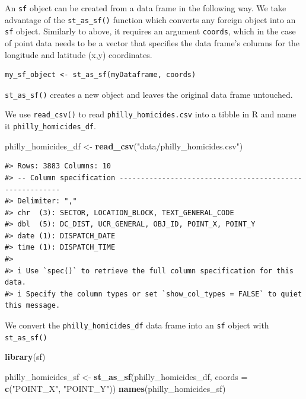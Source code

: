 \documentclass[
]{book}
\newenvironment{Shaded}{\begin{snugshade}}{\end{snugshade}}
\newcommand{\AttributeTok}[1]{\textcolor[rgb]{0.13,0.29,0.53}{#1}}
\newcommand{\FunctionTok}[1]{\textcolor[rgb]{0.13,0.29,0.53}{\textbf{#1}}}
\newcommand{\NormalTok}[1]{#1}
\newcommand{\OtherTok}[1]{\textcolor[rgb]{0.56,0.35,0.01}{#1}}
\newcommand{\StringTok}[1]{\textcolor[rgb]{0.31,0.60,0.02}{#1}}
\begin{document}
An \texttt{sf} object can be created from a data frame in the following way. We take advantage of the \texttt{st\_as\_sf()} function which converts any foreign object into an \texttt{sf} object. Similarly to above, it requires an argument \texttt{coords}, which in the case of point data needs to be a vector that specifies the data frame's columns for the longitude and latitude (x,y) coordinates.

\begin{verbatim}
my_sf_object <- st_as_sf(myDataframe, coords)
\end{verbatim}

\texttt{st\_as\_sf()} creates a new object and leaves the original data frame untouched.

We use \texttt{read\_csv()} to read \texttt{philly\_homicides.csv} into a tibble in R and name it \texttt{philly\_homicides\_df}.

\begin{Shaded}
\begin{Highlighting}[]
\NormalTok{philly\_homicides\_df }\OtherTok{\textless{}{-}} \FunctionTok{read\_csv}\NormalTok{(}\StringTok{"data/philly\_homicides.csv"}\NormalTok{)}
\end{Highlighting}
\end{Shaded}

\begin{verbatim}
#> Rows: 3883 Columns: 10
#> -- Column specification --------------------------------------------------------
#> Delimiter: ","
#> chr  (3): SECTOR, LOCATION_BLOCK, TEXT_GENERAL_CODE
#> dbl  (5): DC_DIST, UCR_GENERAL, OBJ_ID, POINT_X, POINT_Y
#> date (1): DISPATCH_DATE
#> time (1): DISPATCH_TIME
#> 
#> i Use `spec()` to retrieve the full column specification for this data.
#> i Specify the column types or set `show_col_types = FALSE` to quiet this message.
\end{verbatim}

We convert the \texttt{philly\_homicides\_df} data frame into an \texttt{sf} object with \texttt{st\_as\_sf()}

\begin{Shaded}
\begin{Highlighting}[]
\FunctionTok{library}\NormalTok{(sf)}

\NormalTok{philly\_homicides\_sf }\OtherTok{\textless{}{-}} \FunctionTok{st\_as\_sf}\NormalTok{(philly\_homicides\_df, }\AttributeTok{coords =} \FunctionTok{c}\NormalTok{(}\StringTok{"POINT\_X"}\NormalTok{, }\StringTok{"POINT\_Y"}\NormalTok{))}
\FunctionTok{names}\NormalTok{(philly\_homicides\_sf)}
\end{Highlighting}
\end{Shaded}
\end{document}
